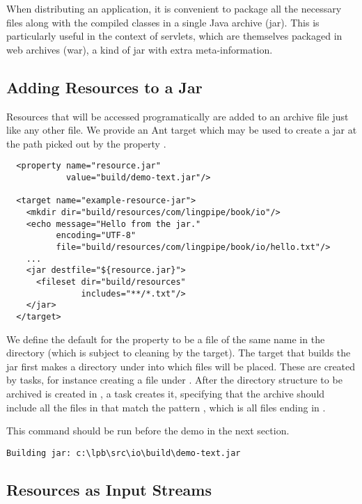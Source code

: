 When distributing an application, it is convenient to package all the
necessary files along with the compiled classes in a single Java
archive (jar).  This is particularly useful in the context of
servlets, which are themselves packaged in web archives (war), a kind
of jar with extra meta-information.

\subsection{Adding Resources to a Jar}

Resources that will be accessed programatically are added to an
archive file just like any other file.  We provide an Ant target
 which may be used to create a jar
at the path picked out by the property .  
%
\begin{verbatim}
  <property name="resource.jar"
            value="build/demo-text.jar"/>

  <target name="example-resource-jar">
    <mkdir dir="build/resources/com/lingpipe/book/io"/>
    <echo message="Hello from the jar."
          encoding="UTF-8"
          file="build/resources/com/lingpipe/book/io/hello.txt"/>
    ...
    <jar destfile="${resource.jar}">
      <fileset dir="build/resources" 
               includes="**/*.txt"/>
    </jar>
  </target>
\end{verbatim}
%
We define the default for the property  to be a
file of the same name in the  directory (which is subject
to cleaning by the  target).  The target that builds the
jar first makes a directory under  into which
files will be placed.  These are created by  tasks, for
instance creating a file  under
.  After the directory structure to be archived
is created in , a  task creates it,
specifying that the archive should include all the files in
 that match the pattern , which
is all files ending in .

This command should be run before the demo in the next section.
%
\begin{verbatim}
Building jar: c:\lpb\src\io\build\demo-text.jar
\end{verbatim}


\subsection{Resources as Input Streams}

